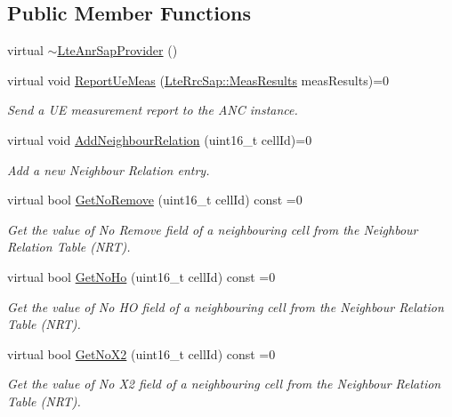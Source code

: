 \subsection*{Public Member Functions}
\begin{DoxyCompactItemize}
\item 
virtual \hyperlink{classns3_1_1LteAnrSapProvider_aa8d5162c9dc7f97846dbdf7a6929a146}{$\sim$\+Lte\+Anr\+Sap\+Provider} ()
\item 
virtual void \hyperlink{classns3_1_1LteAnrSapProvider_ac4f1114bd33d0c189e2ce2624089e587}{Report\+Ue\+Meas} (\hyperlink{structns3_1_1LteRrcSap_1_1MeasResults}{Lte\+Rrc\+Sap\+::\+Meas\+Results} meas\+Results)=0
\begin{DoxyCompactList}\small\item\em Send a UE measurement report to the A\+NC instance. \end{DoxyCompactList}\item 
virtual void \hyperlink{classns3_1_1LteAnrSapProvider_a43054257bfdafb714e3d3821b82e2e33}{Add\+Neighbour\+Relation} (uint16\+\_\+t cell\+Id)=0
\begin{DoxyCompactList}\small\item\em Add a new Neighbour Relation entry. \end{DoxyCompactList}\item 
virtual bool \hyperlink{classns3_1_1LteAnrSapProvider_adaf22322995ffba65c3d606181dcb6a4}{Get\+No\+Remove} (uint16\+\_\+t cell\+Id) const =0
\begin{DoxyCompactList}\small\item\em Get the value of {\itshape No Remove} field of a neighbouring cell from the Neighbour Relation Table (N\+RT). \end{DoxyCompactList}\item 
virtual bool \hyperlink{classns3_1_1LteAnrSapProvider_a825c724cb173ca628ad1fc42f6b86e9f}{Get\+No\+Ho} (uint16\+\_\+t cell\+Id) const =0
\begin{DoxyCompactList}\small\item\em Get the value of {\itshape No HO} field of a neighbouring cell from the Neighbour Relation Table (N\+RT). \end{DoxyCompactList}\item 
virtual bool \hyperlink{classns3_1_1LteAnrSapProvider_a7781c81a1d796484f58a23f4ea44ebd6}{Get\+No\+X2} (uint16\+\_\+t cell\+Id) const =0
\begin{DoxyCompactList}\small\item\em Get the value of {\itshape No X2} field of a neighbouring cell from the Neighbour Relation Table (N\+RT). \end{DoxyCompactList}\end{DoxyCompactItemize}


